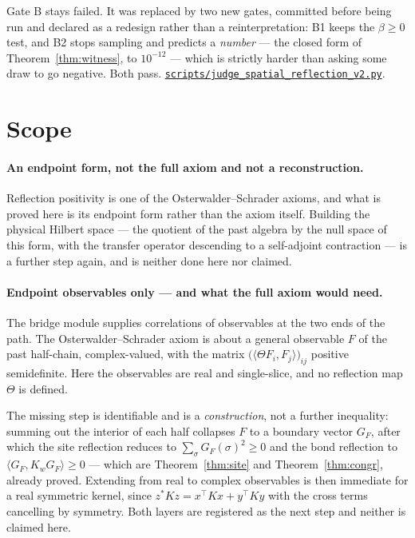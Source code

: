 \documentclass[11pt]{article}
\theoremstyle{definition}
\newcommand{\anchor}{854ff223396630a8a75b0a95a3ada6413f3a395d}
\newcommand{\repofile}[2]{%
  \href{https://github.com/lluiseriksson/THE-ERIKSSON-PROGRAMME/blob/\anchor/#1}{\nolinkurl{#2}}}
\begin{document}
Gate B stays failed.  It was replaced by two new gates, committed before being
run and declared as a redesign rather than a reinterpretation: B1 keeps the
$\beta\ge0$ test, and B2 stops sampling and predicts a \emph{number} --- the
closed form of Theorem~\ref{thm:witness}, to $10^{-12}$ --- which is strictly
harder than asking some draw to go negative.  Both pass.
\repofile{scripts/judge\_spatial\_reflection\_v2.py}{scripts/judge\_spatial\_reflection\_v2.py}.

\section{Scope}\label{sec:scope}

\paragraph{An endpoint form, not the full axiom and not a reconstruction.}
Reflection positivity is one of the Osterwalder--Schrader axioms, and what is
proved here is its endpoint form rather than the axiom itself.  Building the
physical Hilbert space --- the quotient of the past algebra by the null space of
this form, with the transfer operator descending to a self-adjoint contraction
--- is a further step again, and is neither done here nor claimed.

\paragraph{Endpoint observables only --- and what the full axiom would need.}
The bridge module supplies correlations of observables at the two ends of the
path.  The Osterwalder--Schrader axiom is about a general observable $F$ of the
past half-chain, complex-valued, with the matrix
$\bigl(\langle\Theta F_i, F_j\rangle\bigr)_{ij}$ positive semidefinite.  Here
the observables are real and single-slice, and no reflection map $\Theta$ is
defined.

The missing step is identifiable and is a \emph{construction}, not a further
inequality: summing out the interior of each half collapses $F$ to a boundary
vector $G_F$, after which the site reflection reduces to
$\sum_\sigma G_F(\sigma)^2 \ge 0$ and the bond reflection to
$\langle G_F, K_w G_F\rangle \ge 0$ --- which are Theorem~\ref{thm:site} and
Theorem~\ref{thm:congr}, already proved.  Extending from real to complex
observables is then immediate for a real symmetric kernel, since
$z^{*}Kz = x^{\top}Kx + y^{\top}Ky$ with the cross terms cancelling by symmetry.
Both layers are registered as the next step and neither is claimed here.
\end{document}
